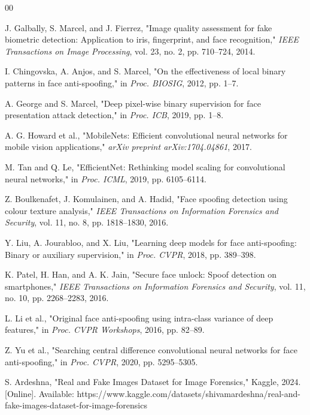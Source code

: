 \documentclass[conference]{IEEEtran}
\begin{document}
\begin{thebibliography}{00}

 J. Galbally, S. Marcel, and J. Fierrez, "Image quality assessment for fake biometric detection: Application to iris, fingerprint, and face recognition," \textit{IEEE Transactions on Image Processing}, vol. 23, no. 2, pp. 710--724, 2014.

 I. Chingovska, A. Anjos, and S. Marcel, "On the effectiveness of local binary patterns in face anti-spoofing," in \textit{Proc. BIOSIG}, 2012, pp. 1--7.

 A. George and S. Marcel, "Deep pixel-wise binary supervision for face presentation attack detection," in \textit{Proc. ICB}, 2019, pp. 1--8.

 A. G. Howard et al., "MobileNets: Efficient convolutional neural networks for mobile vision applications," \textit{arXiv preprint arXiv:1704.04861}, 2017.

 M. Tan and Q. Le, "EfficientNet: Rethinking model scaling for convolutional neural networks," in \textit{Proc. ICML}, 2019, pp. 6105--6114.

 Z. Boulkenafet, J. Komulainen, and A. Hadid, "Face spoofing detection using colour texture analysis," \textit{IEEE Transactions on Information Forensics and Security}, vol. 11, no. 8, pp. 1818--1830, 2016.

 Y. Liu, A. Jourabloo, and X. Liu, "Learning deep models for face anti-spoofing: Binary or auxiliary supervision," in \textit{Proc. CVPR}, 2018, pp. 389--398.

 K. Patel, H. Han, and A. K. Jain, "Secure face unlock: Spoof detection on smartphones," \textit{IEEE Transactions on Information Forensics and Security}, vol. 11, no. 10, pp. 2268--2283, 2016.

 L. Li et al., "Original face anti-spoofing using intra-class variance of deep features," in \textit{Proc. CVPR Workshops}, 2016, pp. 82--89.

 Z. Yu et al., "Searching central difference convolutional neural networks for face anti-spoofing," in \textit{Proc. CVPR}, 2020, pp. 5295--5305.

 S. Ardeshna, "Real and Fake Images Dataset for Image Forensics," Kaggle, 2024. [Online]. Available: https://www.kaggle.com/datasets/shivamardeshna/real-and-fake-images-dataset-for-image-forensics

\end{thebibliography}
\end{document}
